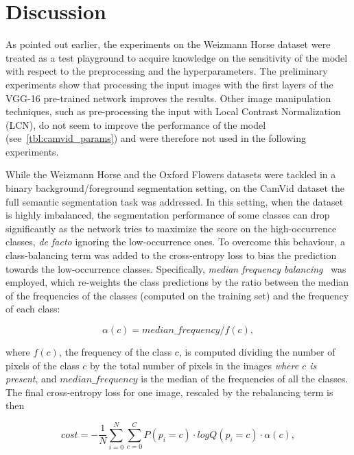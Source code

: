 \section{Discussion}

As pointed out earlier, the experiments on the Weizmann Horse dataset were
treated as a test playground to acquire knowledge on the sensitivity of the
model with respect to the preprocessing and the hyperparameters. The
preliminary experiments show that processing the input images with the first
layers of the VGG-16 pre-trained network improves the results. Other image
manipulation techniques, such as pre-processing the input with Local Contrast
Normalization (LCN), do not seem to improve the performance of the model
(see~\autoref{tbl:camvid_params}) and were therefore not used in the following
experiments.

While the Weizmann Horse and the Oxford Flowers datasets were tackled in a
binary background/foreground segmentation setting, on the CamVid dataset the
full semantic segmentation task was addressed. In this setting, when the
dataset is highly imbalanced, the segmentation performance of some classes can
drop significantly as the network tries to maximize the score on the
high-occurrence classes, {\em de facto} \/ignoring the low-occurrence ones. To
overcome this behaviour, a class-balancing term was added to the cross-entropy
loss to bias the prediction towards the low-occurrence classes. Specifically,
\emph{median frequency balancing}~\citep{eigen2015predicting} was employed,
which re-weights the class predictions by the ratio between the median of the
frequencies of the classes (computed on the training set) and the frequency of
each class:

\begin{equation}
    \alpha(c) = median\_frequency / f(c),
\end{equation}

\noindent where $f(c)$, the frequency of the class $c$, is computed dividing
the number of pixels of the class $c$ by the total number of pixels in the
images \emph{where $c$ is present}, and $median\_frequency$ is the median of
the frequencies of all the classes. The final cross-entropy loss for one image,
rescaled by the rebalancing term is then

\begin{equation}
    cost = -\frac{1}{N} \sum_{i=0}^N \sum_{c=0}^C P(p_i = c) \cdot logQ(p_i= c)
        \cdot \alpha(c),
\end{equation}

